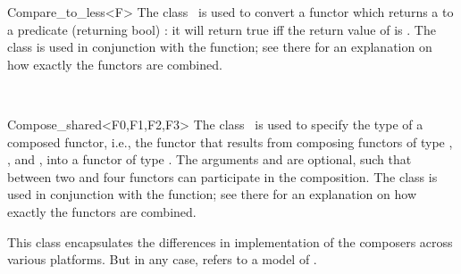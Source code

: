 \begin{ccRefClass}{Compare_to_less<F>}
  \ccDefinition The class \ccRefName\ is used to convert a functor which
  returns a  to a predicate (returning bool) : it
  will return true iff the return value of  is .
  The class is used in conjunction with the 
  function; see there for an explanation on how exactly the functors
  are combined.

  
  \ccTypes
  
  \ccSeeAlso
  \\
  
\end{ccRefClass}

\begin{ccRefClass}{Compose_shared<F0,F1,F2,F3>}
  \ccDefinition The class \ccRefName\ is used to specify the type of a
  composed functor, i.e., the functor that results from composing
  functors of type , , and , into a functor of
  type . The arguments  and  are optional,
  such that between two and four functors can participate in the
  composition. The class is used in conjunction with the
   function; see there for an explanation on how
  exactly the functors are combined.

  
  \ccTypes
  
   This class encapsulates the differences in
  implementation of the composers across various platforms. But in any
  case,  refers to a model of .

  \ccSeeAlso
  \\
  
\end{ccRefClass}


